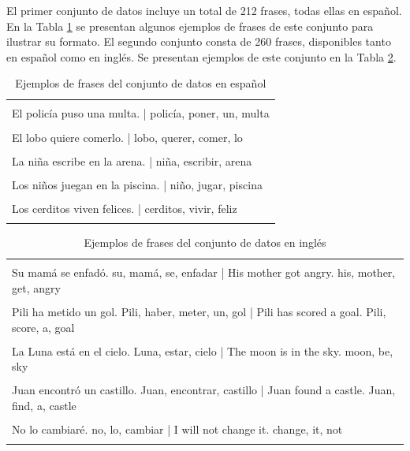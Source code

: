 \documentclass[11pt,spanish,listoffigures,listoftables]{tfgetsinf}
\begin{document}
El primer conjunto de datos incluye un total de 212 frases, todas ellas en español. En la Tabla \ref{tab: ejemplosEspañol} se presentan algunos ejemplos de frases de este conjunto para ilustrar su formato. El segundo conjunto consta de 260 frases, disponibles tanto en español como en inglés. Se presentan ejemplos de este conjunto en la Tabla \ref{tab: ejemplosInglés}.

\begin{table}[!h]
\caption{Ejemplos de frases del conjunto de datos en español}
\begin{center}
\begin{tabular}{ | l | }
\hline
	\\
	El policía puso una multa. | policía, poner, un, multa \\
	\\
	El lobo quiere comerlo. | lobo, querer, comer, lo \\
	\\
	La niña escribe en la arena. | niña, escribir, arena \\
	\\
	Los niños juegan en la piscina. | niño, jugar, piscina \\
	\\
	Los cerditos viven felices. | cerditos, vivir, feliz \\
	\\
\hline
\end{tabular}
\end{center}
\label{tab: ejemplosEspañol}
\end{table}

\begin{table}[!h]
\caption{Ejemplos de frases del conjunto de datos en inglés}
\begin{center}
\begin{tabular}{ | l | }
\hline
	\\
	Su mamá se enfadó.	su, mamá, se, enfadar | His mother got angry.	his, mother, get, angry \\
	\\
	Pili ha metido un gol.	Pili, haber, meter, un, gol | Pili has scored a goal.	Pili, score, a, goal \\
	\\
	La Luna está en el cielo.	Luna, estar, cielo | The moon is in the sky.	moon, be, sky \\
	\\
	Juan encontró un castillo.	Juan, encontrar, castillo | Juan found a castle.	Juan, find, a, castle \\
	\\
	No lo cambiaré.	no, lo, cambiar | I will not change it.	change, it, not \\
	\\
\hline
\end{tabular}
\end{center}
\label{tab: ejemplosInglés}
\end{table}
\end{document}
